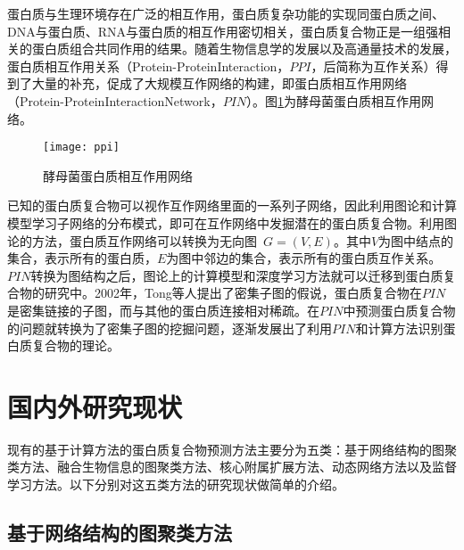 蛋白质与生理环境存在广泛的相互作用，蛋白质复杂功能的实现同蛋白质之间、DNA与蛋白质、RNA与蛋白质的相互作用密切相关，蛋白质复合物正是一组强相关的蛋白质组合共同作用的结果。随着生物信息学的发展以及高通量技术的发展，蛋白质相互作用关系（Protein-ProteinInteraction，$PPI$，后简称为互作关系）得到了大量的补充，促成了大规模互作网络的构建\cite{butland_interaction_2005}，即蛋白质相互作用网络（Protein-ProteinInteractionNetwork，$PIN$）。图\ref{fig:ppi}为酵母菌蛋白质相互作用网络。
\begin{figure}[htbp]
  \centering
  \texttt{[image: ppi]}
  \caption{酵母菌蛋白质相互作用网络}
  \label{fig:ppi}
\end{figure}
已知的蛋白质复合物可以视作互作网络里面的一系列子网络，因此利用图论和计算模型学习子网络的分布模式，即可在互作网络中发掘潜在的蛋白质复合物\cite{legrain_proteinprotein_2001}。利用图论的方法，蛋白质互作网络可以转换为无向图~$G=(V,E)$。其中$V$为图中结点的集合，表示所有的蛋白质，$E$为图中邻边的集合，表示所有的蛋白质互作关系。$PIN$转换为图结构之后，图论上的计算模型和深度学习方法就可以迁移到蛋白质复合物的研究中。2002年，Tong\cite{tong_combined_2002}等人提出了密集子图的假说，蛋白质复合物在$PIN$是密集链接的子图，而与其他的蛋白质连接相对稀疏。在$PIN$中预测蛋白质复合物的问题就转换为了密集子图的挖掘问题，逐渐发展出了利用$PIN$和计算方法识别蛋白质复合物的理论。

\section{国内外研究现状}
\label{section:research}

现有的基于计算方法的蛋白质复合物预测方法主要分为五类：基于网络结构的图聚类方法、融合生物信息的图聚类方法、核心附属扩展方法、动态网络方法以及监督学习方法。以下分别对这五类方法的研究现状做简单的介绍。

\subsection{基于网络结构的图聚类方法}
\label{section:TopologyMethod}

